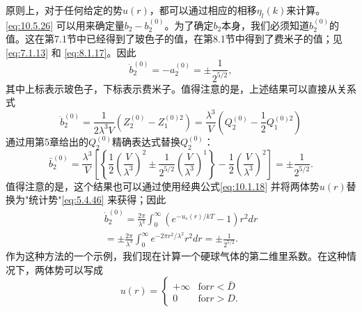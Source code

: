 原则上，对于任何给定的势\(u(r)\)，都可以通过相应的相移\(\eta_{l}(k)\)来计算。
\autoref{eq:10.5.26} 可以用来确定量\(b_{2}-b_{2}^{(0)}\)。为了确定\(b_{2}\)本身，我们必须知道\(b_{2}^{(0)}\)的值。这在第7.1节中已经得到了玻色子的值，在第8.1节中得到了费米子的值；见\autoref{eq:7.1.13} 和 \autoref{eq:8.1.17}。因此
\begin{equation}\tag{10.5.27}\label{eq:10.5.27}
\ddot { b } _ { 2 } ^{( 0 )} = - a _ { 2 } ^{( 0 )} = \pm \frac { 1 } { 2 ^{5 / 2} } ,
\end{equation}
其中上标表示玻色子，下标表示费米子。值得注意的是，上述结果可以直接从关系式
\begin{equation}\tag{10.5.28}\label{eq:10.5.28}
\ddot { b } _ { 2 } ^{( 0 )} = \frac { 1 } { 2 \lambda ^{3} V } \left( Z _ { 2 } ^{( 0 )} - Z _ { 1 } ^{( 0 ) 2} \right) = \frac { \lambda ^{3} } { V } \left( Q _ { 2 } ^{( 0 )} - \frac { 1 } { 2 } Q _ { 1 } ^{( 0 ) 2} \right)
\end{equation}
通过用第5章给出的\(Q_{2}^{(0)}\)精确表达式替换\(Q_{2}^{(0)}\)：
\begin{equation}\tag{10.5.29}\label{eq:10.5.29}
\bar { b } _ { 2 } ^{( 0 )} = \frac { \lambda ^{3} } { V } \left[ \left\{ \frac { 1 } { 2 } \left( \frac { V } { \lambda ^{3} } \right) ^{2} \pm \frac { 1 } { 2 ^{5 / 2} } \left( \frac { V } { \lambda ^{3} } \right) ^{1} \right\} - \frac { 1 } { 2 } \left( \frac { V } { \lambda ^{3} } \right) ^{2} \right] = \pm \frac { 1 } { 2 ^{5 / 2} } .
\end{equation}
值得注意的是，这个结果也可以通过使用经典公式\autoref{eq:10.1.18} 并将两体势\(u(r)\)替换为"统计势"\autoref{eq:5.4.46} 来获得；因此
\begin{equation}\tag{10.5.30}\label{eq:10.5.30}
\begin{array}{r} { \dot { b } _ { 2 } ^{( 0 )} = \frac { 2 \pi } { \lambda ^{3} } \int _ { 0 } ^{\infty} \left( e ^{- u _ { s} ( r ) / k T } - 1 \right) r ^{2} d r } \\{ = \pm \frac { 2 \pi } { \lambda ^{3} } \int _ { 0 } ^{\infty} e ^{- 2 \pi r ^ { 2} / \lambda ^{2} } r ^{2} d r = \pm \frac { 1 } { 2 ^{5 / 2} } . } \end{array}
\end{equation}
作为这种方法的一个示例，我们现在计算一个硬球气体的第二维里系数。在这种情况下，两体势可以写成
\begin{equation}\tag{10.5.31}\label{eq:10.5.31}
u ( r ) = \left\{ \begin{array}{ll} { + \infty } & { \mathrm { f o r }  r < \bar { D } } \\{ 0 } & { \mathrm { f o r }  r > D . } \end{array} \right.
\end{equation}
